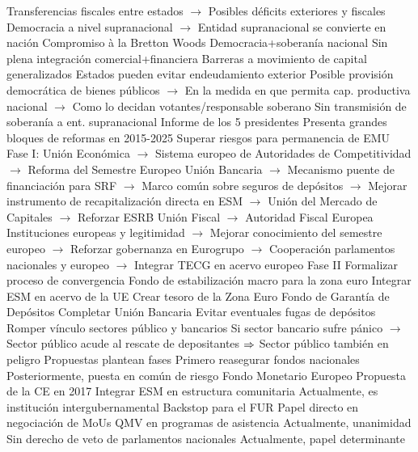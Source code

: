 \documentclass{nuevotema}
\begin{document}
\begin{esquemal}
				\4[] Transferencias fiscales entre estados
				\4[] $\to$ Posibles déficits exteriores y fiscales
				\4[] Democracia a nivel supranacional
				\4[] $\to$ Entidad supranacional se convierte en nación
				\4[C] Compromiso à la Bretton Woods
				\4[] Democracia+soberanía nacional
				\4[] Sin plena integración comercial+financiera
				\4[] Barreras a movimiento de capital generalizados
				\4[] Estados pueden evitar endeudamiento exterior
				\4[] Posible provisión democrática de bienes públicos
				\4[] $\to$ En la medida en que permita cap. productiva nacional
				\4[] $\to$ Como lo decidan votantes/responsable soberano
				\4[] Sin transmisión de soberanía a ent. supranacional
			\3 Informe de los 5 presidentes
				\4 Presenta grandes bloques de reformas en 2015-2025
				\4 Superar riesgos para permanencia de EMU
				\4 Fase I:
				\4[] Unión Económica
				\4[] $\to$ Sistema europeo de Autoridades de Competitividad
				\4[] $\to$ Reforma del Semestre Europeo
				\4[] Unión Bancaria
				\4[] $\to$ Mecanismo puente de financiación para SRF
				\4[] $\to$ Marco común sobre seguros de depósitos
				\4[] $\to$ Mejorar instrumento de recapitalización directa en ESM
				\4[] $\to$ Unión del Mercado de Capitales
				\4[] $\to$ Reforzar ESRB
				\4[] Unión Fiscal
				\4[] $\to$ Autoridad Fiscal Europea
				\4[] Instituciones europeas y legitimidad
				\4[] $\to$ Mejorar conocimiento del semestre europeo
				\4[] $\to$ Reforzar gobernanza en Eurogrupo
				\4[] $\to$ Cooperación parlamentos nacionales y europeo
				\4[] $\to$ Integrar TECG en acervo europeo
				\4 Fase II
				\4[] Formalizar proceso de convergencia
				\4[] Fondo de estabilización macro para la zona euro
				\4[] Integrar ESM en acervo de la UE
				\4[] Crear tesoro de la Zona Euro
			\3 Fondo de Garantía de Depósitos
				\4 Completar Unión Bancaria
				\4 Evitar eventuales fugas de depósitos
				\4 Romper vínculo sectores público y bancarios
				\4[] Si sector bancario sufre pánico
				\4[] $\to$ Sector público acude al rescate de depositantes
				\4[] $\Rightarrow$ Sector público también en peligro
				\4 Propuestas plantean fases
				\4[] Primero reasegurar fondos nacionales
				\4[] Posteriormente, puesta en común de riesgo
			\3 Fondo Monetario Europeo
				\4 Propuesta de la CE en 2017
				\4 Integrar ESM en estructura comunitaria
				\4[] Actualmente, es institución intergubernamental
				\4 Backstop para el FUR
				\4 Papel directo en negociación de MoUs
				\4 QMV en programas de asistencia
				\4[] Actualmente, unanimidad
				\4 Sin derecho de veto de parlamentos nacionales
				\4[] Actualmente, papel determinante

\end{esquemal}
\end{document}
